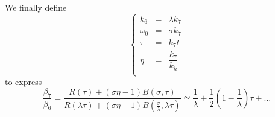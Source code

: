 \documentclass[aps,onecolumn,12pt]{revtex4}
\begin{document}
We finally define
\begin{equation}
\left\lbrace
\begin{array}{rcl}
	k_6 & = & \lambda k_7\\
	\omega_0 & = & \sigma k_7 \\
	\tau & = & k_7 t\\
	\eta & = & \dfrac{k_7}{k_h} \\
\end{array}
\right.
\end{equation}
to express
\begin{equation}
		\dfrac{\beta_7}{\beta_6}
		 = \dfrac{ R(\tau) + \left(\sigma\eta-1\right) B(\sigma,\tau) }{R(\lambda \tau) + \left(\sigma\eta-1\right) B(\frac{\sigma}{\lambda},\lambda \tau)}
\simeq \dfrac{1}{\lambda} + \dfrac{1}{2} \left(1-\dfrac{1}{\lambda}\right) \tau + \ldots
\end{equation}
\end{document}
